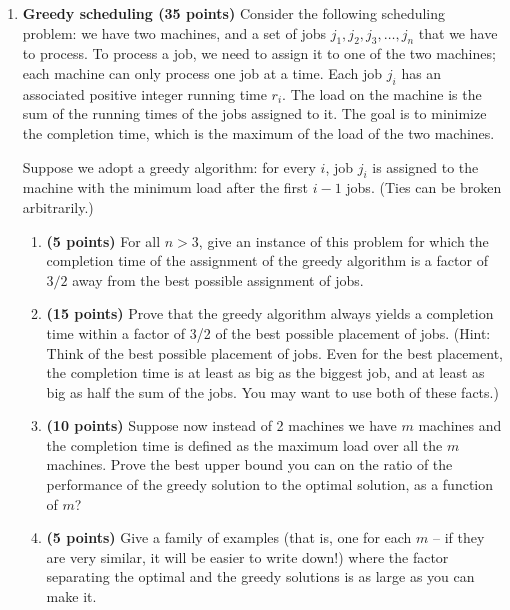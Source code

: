 \documentclass[11pt]{article}
\begin{document}
\begin{enumerate}
\item {\bf Greedy scheduling (35 points)} Consider the following scheduling problem: we have two machines,
and a set of jobs $j_1,j_2,j_3,\ldots,j_n$ that we have to process.
To process a job, we need to assign it to one of the two machines;
each machine can only process one job at a time. 
Each job $j_i$ has an associated positive integer running time $r_i$.  The load on the 
machine is the sum of the running times of the jobs assigned to  it. 
The goal is to minimize the completion time, which is the maximum of the load of the two machines.  

Suppose we adopt a greedy algorithm: for every $i$, job $j_i$ is assigned to the
machine with the minimum load after the first $i-1$ jobs.  (Ties can
be broken arbitrarily.) 
\begin{enumerate}
\item
{\bf (5 points)} 
For all $n > 3$, give an instance of this problem for which
the completion time of the assignment of the greedy algorithm is a factor of $3/2$ away from the best
possible assignment of jobs.
\item
{\bf (15 points)}
Prove that the greedy algorithm always yields a completion
time within a factor of 3/2 of the best possible placement of jobs.
(Hint: Think of the best possible placement of jobs.  Even for the
best placement, the completion time is at least as big as the biggest
job, and at least as big as half the sum of the jobs.  You may want to
use both of these facts.)
\item
{\bf (10 points)} 
Suppose now instead of 2 machines we have $m$ machines and the completion time is defined as the maximum load over all the $m$ machines.  
Prove the best upper bound you can on the ratio of the 
performance of the greedy solution to the optimal solution, as a
function of $m$? 
\item
{\bf (5 points)} 
Give a family of examples (that is, one for
each $m$ -- if they are very similar, it will be easier to write
down!) where the factor separating the optimal and the greedy solutions
is as large as you can make it.
\end{enumerate}


\end{enumerate}
\end{document}
